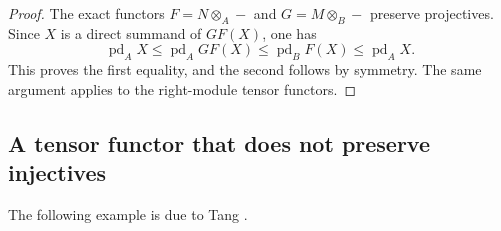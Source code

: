 \documentclass[12pt,a4paper,english,reqno]{amsart}
\numberwithin{equation}{section}
\theoremstyle{plain}
\theoremstyle{definition}
\begin{document}
\begin{proof}
The exact functors $F=N\otimes_A-$ and $G=M\otimes_B-$ preserve
projectives.  Since $X$ is a direct summand of $GF(X)$, one has
\[
 \operatorname{pd}_A X
 \leq \operatorname{pd}_A GF(X)
 \leq \operatorname{pd}_B F(X)
 \leq \operatorname{pd}_A X .
\]
This proves the first equality, and the second follows by symmetry.
The same argument applies to the right-module tensor functors.
\end{proof}

\subsection{A tensor functor that does not preserve injectives}

The following example is due to Tang \cite[Section~3]{bel-Tang2026}.
\end{document}
